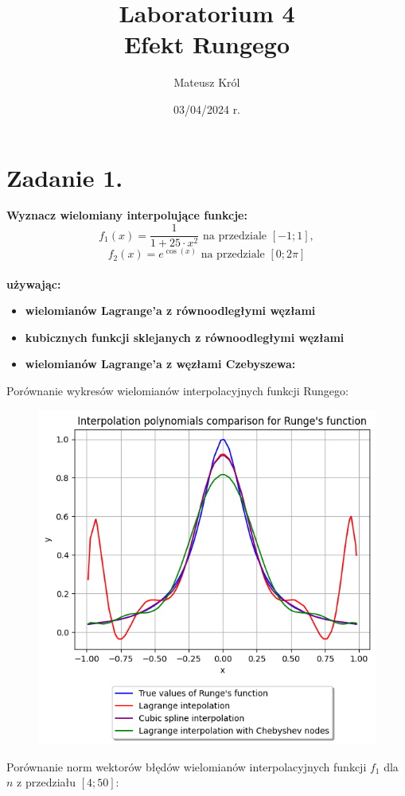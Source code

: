 \documentclass{article}
\title{%
Laboratorium 4\\
  \huge Efekt Rungego}
\author{Mateusz Król}
\date{03/04/2024 r.}
\begin{document}
\maketitle


\section*{Zadanie 1.}
\textbf{Wyznacz wielomiany interpolujące funkcje:}
$$f_1(x) = \frac{1}{1 + 25\cdot x^2} \mbox{ na przedziale } [-1; 1], $$
$$f_2(x) = e^{\cos(x)} \mbox{ na przedziale } [0; 2\pi]$$
\\
\textbf{używając:} 
\begin{itemize}
  \item \textbf{wielomianów Lagrange’a z równoodległymi węzłami}
  \item \textbf{kubicznych funkcji sklejanych z równoodległymi węzłami} 
  \item \textbf{wielomianów Lagrange’a z węzłami Czebyszewa:}
\end{itemize} 
\newpage
Porównanie wykresów wielomianów interpolacyjnych funkcji Rungego: \\

\begin{figure}[H]
  \includegraphics[width=\linewidth]{figures/interpolation.png}
\end{figure}
\newpage
Porównanie norm wektorów błędów wielomianów interpolacyjnych funkcji $f_1$ dla
 $n$ z przedziału $[4;50]$: \\
\end{document}
